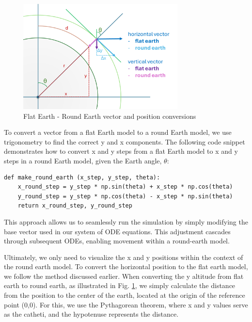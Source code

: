 \documentclass[runningheads]{llncs}
\begin{document}
\begin{figure}
\centering
\includegraphics[width=0.75\textwidth]{images/round earth vector conversion.png}
\caption{Flat Earth - Round Earth vector and position conversions} \label{round_earth_vector}
\end{figure}

To convert a vector from a flat Earth model to a round Earth model, we use trigonometry to find the correct y and x components. The following code snippet demonstrates how to convert x and y steps from a flat Earth model to x and y steps in a round Earth model, given the Earth angle, \(\theta\):

\begin{verbatim}
def make_round_earth (x_step, y_step, theta):
    x_round_step = y_step * np.sin(theta) + x_step * np.cos(theta)  
    y_round_step = y_step * np.cos(theta) - x_step * np.sin(theta)  
    return x_round_step, y_round_step
\end{verbatim}

This approach allows us to seamlessly run the simulation by simply modifying the base vector used in our system of ODE equations. This adjustment cascades through subsequent ODEs, enabling movement within a round-earth model.

Ultimately, we only need to visualize the x and y positions within the context of the round earth model. To convert the horizontal position to the flat earth model, we follow the method discussed earlier. When converting the y altitude from flat earth to round earth, as illustrated in Fig. \ref{round_earth_vector}, we simply calculate the distance from the position to the center of the earth, located at the origin of the reference point (0,0). For this, we use the Pythagorean theorem, where x and y values serve as the catheti, and the hypotenuse represents the distance.
\end{document}
